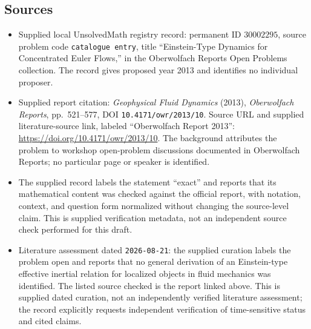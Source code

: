 \documentclass[11pt]{article}
\begin{document}
\subsection{Sources}
\begin{itemize}
\item Supplied local UnsolvedMath registry record: permanent ID \(30002295\), source problem code \texttt{catalogue entry}, title ``Einstein-Type Dynamics for Concentrated Euler Flows,'' in the Oberwolfach Reports Open Problems collection. The record gives proposed year 2013 and identifies no individual proposer.
\item Supplied report citation: \emph{Geophysical Fluid Dynamics} (2013), \emph{Oberwolfach Reports}, pp.\ 521--577, DOI \texttt{10.4171/owr/2013/10}. Source URL and supplied literature-source link, labeled ``Oberwolfach Report 2013'': \url{https://doi.org/10.4171/owr/2013/10}. The background attributes the problem to workshop open-problem discussions documented in Oberwolfach Reports; no particular page or speaker is identified.
\item The supplied record labels the statement ``exact'' and reports that its mathematical content was checked against the official report, with notation, context, and question form normalized without changing the source-level claim. This is supplied verification metadata, not an independent source check performed for this draft.
\item Literature assessment dated \texttt{2026-08-21}: the supplied curation labels the problem open and reports that no general derivation of an Einstein-type effective inertial relation for localized objects in fluid mechanics was identified. The listed source checked is the report linked above. This is supplied dated curation, not an independently verified literature assessment; the record explicitly requests independent verification of time-sensitive status and cited claims.
\end{itemize}
\end{document}
